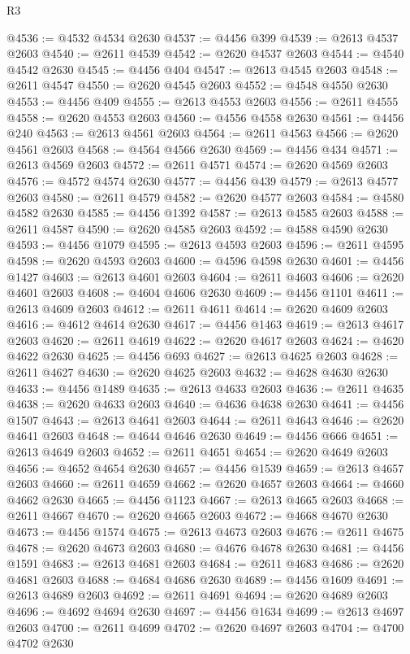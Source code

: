 \begin{lexlean}{R3}
\begin{coremodule}
@4536 := @4532 @4534 @2630
@4537 := @4456 @399
@4539 := @2613 @4537 @2603
@4540 := @2611 @4539
@4542 := @2620 @4537 @2603
@4544 := @4540 @4542 @2630
@4545 := @4456 @404
@4547 := @2613 @4545 @2603
@4548 := @2611 @4547
@4550 := @2620 @4545 @2603
@4552 := @4548 @4550 @2630
@4553 := @4456 @409
@4555 := @2613 @4553 @2603
@4556 := @2611 @4555
@4558 := @2620 @4553 @2603
@4560 := @4556 @4558 @2630
@4561 := @4456 @240
@4563 := @2613 @4561 @2603
@4564 := @2611 @4563
@4566 := @2620 @4561 @2603
@4568 := @4564 @4566 @2630
@4569 := @4456 @434
@4571 := @2613 @4569 @2603
@4572 := @2611 @4571
@4574 := @2620 @4569 @2603
@4576 := @4572 @4574 @2630
@4577 := @4456 @439
@4579 := @2613 @4577 @2603
@4580 := @2611 @4579
@4582 := @2620 @4577 @2603
@4584 := @4580 @4582 @2630
@4585 := @4456 @1392
@4587 := @2613 @4585 @2603
@4588 := @2611 @4587
@4590 := @2620 @4585 @2603
@4592 := @4588 @4590 @2630
@4593 := @4456 @1079
@4595 := @2613 @4593 @2603
@4596 := @2611 @4595
@4598 := @2620 @4593 @2603
@4600 := @4596 @4598 @2630
@4601 := @4456 @1427
@4603 := @2613 @4601 @2603
@4604 := @2611 @4603
@4606 := @2620 @4601 @2603
@4608 := @4604 @4606 @2630
@4609 := @4456 @1101
@4611 := @2613 @4609 @2603
@4612 := @2611 @4611
@4614 := @2620 @4609 @2603
@4616 := @4612 @4614 @2630
@4617 := @4456 @1463
@4619 := @2613 @4617 @2603
@4620 := @2611 @4619
@4622 := @2620 @4617 @2603
@4624 := @4620 @4622 @2630
@4625 := @4456 @693
@4627 := @2613 @4625 @2603
@4628 := @2611 @4627
@4630 := @2620 @4625 @2603
@4632 := @4628 @4630 @2630
@4633 := @4456 @1489
@4635 := @2613 @4633 @2603
@4636 := @2611 @4635
@4638 := @2620 @4633 @2603
@4640 := @4636 @4638 @2630
@4641 := @4456 @1507
@4643 := @2613 @4641 @2603
@4644 := @2611 @4643
@4646 := @2620 @4641 @2603
@4648 := @4644 @4646 @2630
@4649 := @4456 @666
@4651 := @2613 @4649 @2603
@4652 := @2611 @4651
@4654 := @2620 @4649 @2603
@4656 := @4652 @4654 @2630
@4657 := @4456 @1539
@4659 := @2613 @4657 @2603
@4660 := @2611 @4659
@4662 := @2620 @4657 @2603
@4664 := @4660 @4662 @2630
@4665 := @4456 @1123
@4667 := @2613 @4665 @2603
@4668 := @2611 @4667
@4670 := @2620 @4665 @2603
@4672 := @4668 @4670 @2630
@4673 := @4456 @1574
@4675 := @2613 @4673 @2603
@4676 := @2611 @4675
@4678 := @2620 @4673 @2603
@4680 := @4676 @4678 @2630
@4681 := @4456 @1591
@4683 := @2613 @4681 @2603
@4684 := @2611 @4683
@4686 := @2620 @4681 @2603
@4688 := @4684 @4686 @2630
@4689 := @4456 @1609
@4691 := @2613 @4689 @2603
@4692 := @2611 @4691
@4694 := @2620 @4689 @2603
@4696 := @4692 @4694 @2630
@4697 := @4456 @1634
@4699 := @2613 @4697 @2603
@4700 := @2611 @4699
@4702 := @2620 @4697 @2603
@4704 := @4700 @4702 @2630

\end{coremodule}
\end{lexlean}
